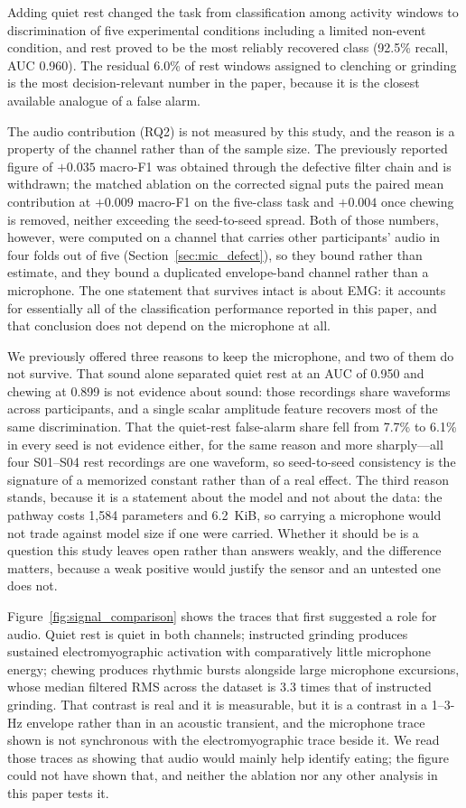 \documentclass[pdflatex,sn-nature,iicol]{sn-jnl}
\begin{document}
Adding quiet rest changed the task from classification among activity windows to discrimination of five experimental conditions including a limited non-event condition, and rest proved to be the most reliably recovered class (92.5\% recall, AUC 0.960). The residual 6.0\% of rest windows assigned to clenching or grinding is the most decision-relevant number in the paper, because it is the closest available analogue of a false alarm.

The audio contribution (RQ2) is not measured by this study, and the reason is a property of the channel rather than of the sample size. The previously reported figure of $+0.035$ macro-F1 was obtained through the defective filter chain and is withdrawn; the matched ablation on the corrected signal puts the paired mean contribution at $+0.009$ macro-F1 on the five-class task and $+0.004$ once chewing is removed, neither exceeding the seed-to-seed spread. Both of those numbers, however, were computed on a channel that carries other participants' audio in four folds out of five (Section~\ref{sec:mic_defect}), so they bound rather than estimate, and they bound a duplicated envelope-band channel rather than a microphone. The one statement that survives intact is about EMG: it accounts for essentially all of the classification performance reported in this paper, and that conclusion does not depend on the microphone at all.

We previously offered three reasons to keep the microphone, and two of them do not survive. That sound alone separated quiet rest at an AUC of 0.950 and chewing at 0.899 is not evidence about sound: those recordings share waveforms across participants, and a single scalar amplitude feature recovers most of the same discrimination. That the quiet-rest false-alarm share fell from 7.7\% to 6.1\% in every seed is not evidence either, for the same reason and more sharply---all four S01--S04 rest recordings are one waveform, so seed-to-seed consistency is the signature of a memorized constant rather than of a real effect. The third reason stands, because it is a statement about the model and not about the data: the pathway costs 1,584 parameters and 6.2~KiB, so carrying a microphone would not trade against model size if one were carried. Whether it should be is a question this study leaves open rather than answers weakly, and the difference matters, because a weak positive would justify the sensor and an untested one does not.

Figure~\ref{fig:signal_comparison} shows the traces that first suggested a role for audio. Quiet rest is quiet in both channels; instructed grinding produces sustained electromyographic activation with comparatively little microphone energy; chewing produces rhythmic bursts alongside large microphone excursions, whose median filtered RMS across the dataset is 3.3 times that of instructed grinding. That contrast is real and it is measurable, but it is a contrast in a 1--3-Hz envelope rather than in an acoustic transient, and the microphone trace shown is not synchronous with the electromyographic trace beside it. We read those traces as showing that audio would mainly help identify eating; the figure could not have shown that, and neither the ablation nor any other analysis in this paper tests it.
\end{document}
